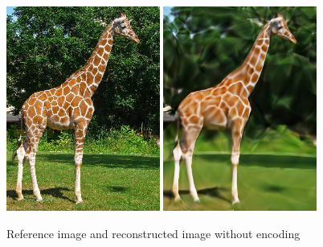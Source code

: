 \begin{figure}[h]
  \begin{minipage}{.48\textwidth}
    \centering
    {\includegraphics[width=0.45\textwidth]{Bilder/Giraffe/Giraffe_verkleinert_400x300.eps}}
    {\includegraphics[width=0.45\textwidth]{Bilder/Giraffe/image_result_scale12000_indim2_lr0.003333.eps}}
\caption{Reference image \cite{giraffeonline} and reconstructed image without encoding}
\label{InputNoEnc}
\end{minipage}\quad
\begin{minipage}[c]{.25\textwidth}
  \centering

\end{minipage}
\end{figure}
